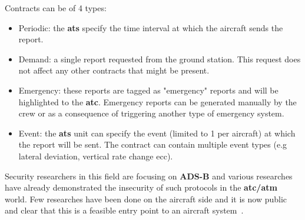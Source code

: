 \documentclass[../main.tex]{subfiles}
\begin{document}
Contracts can be of 4 types:

\begin{itemize}
  \item Periodic: the \textbf{\acrshort{ats}} specify the time interval at which the aircraft sends the report.
  \item Demand: a single report requested from the ground station. This request does not affect any other contracts that might be present.
  \item Emergency: these reports are tagged as "emergency" reports and will be highlighted to the \textbf{\acrshort{atc}}. Emergency reports can be generated manually by the crew or as a consequence of triggering another type of emergency system.
  \item Event: the \textbf{\acrshort{ats}} unit can specify the event (limited to 1 per aircraft) at which the report will be sent. The contract can contain multiple event types (e.g lateral deviation, vertical rate change ecc).
\end{itemize}

Security researchers in this field are focusing on \textbf{ADS-B} and various researches \cite{costin2012ghost,renderman} have already demonstrated the insecurity of such protocols in the \textbf{\acrshort{atc}/\acrshort{atm}} world. Few researches have been done on the aircraft side and it is now public and clear that this is a feasible entry point to an aircraft system~\cite{news-boeinghack-cso}.
\end{document}

